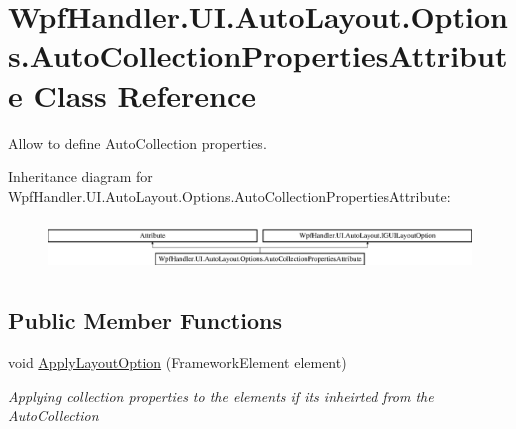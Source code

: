 \hypertarget{class_wpf_handler_1_1_u_i_1_1_auto_layout_1_1_options_1_1_auto_collection_properties_attribute}{}\section{Wpf\+Handler.\+U\+I.\+Auto\+Layout.\+Options.\+Auto\+Collection\+Properties\+Attribute Class Reference}
\label{class_wpf_handler_1_1_u_i_1_1_auto_layout_1_1_options_1_1_auto_collection_properties_attribute}


Allow to define Auto\+Collection properties.  


Inheritance diagram for Wpf\+Handler.\+U\+I.\+Auto\+Layout.\+Options.\+Auto\+Collection\+Properties\+Attribute\+:\begin{figure}[H]
\begin{center}
\leavevmode
\includegraphics[height=1.372549cm]{d7/de8/class_wpf_handler_1_1_u_i_1_1_auto_layout_1_1_options_1_1_auto_collection_properties_attribute}
\end{center}
\end{figure}
\subsection*{Public Member Functions}
\begin{DoxyCompactItemize}
\item 
void \mbox{\hyperlink{class_wpf_handler_1_1_u_i_1_1_auto_layout_1_1_options_1_1_auto_collection_properties_attribute_aaff2195c793c7e75ac553291d9189655}{Apply\+Layout\+Option}} (Framework\+Element element)
\begin{DoxyCompactList}\small\item\em Applying collection properties to the elements if it\textquotesingle{}s inheirted from the Auto\+Collection \end{DoxyCompactList}\end{DoxyCompactItemize}
